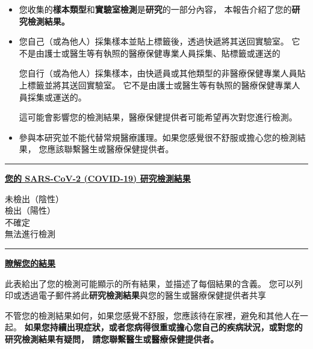 \documentclass[10pt]{article}
\newcommand{\PageLine}{\rule{\textwidth}{0.25mm}}
\begin{document}
\begin{itemize}
\item

  您收集的\textbf{樣本類型}和\textbf{實驗室檢測}是\textbf{研究}的一部分內容，
  本報告介紹了您的\textbf{研究檢測結果。}

\item
  您自己（或為他人）採集樣本並貼上標籤後，透過快遞將其送回實驗室。
  它不是由護士或醫生等有執照的醫療保健專業人員採集、貼標籤或運送的

  您自行（或為他人）採集樣本，由快遞員或其他類型的非醫療保健專業人員貼上標籤並將其送回實驗室。
  它不是由護士或醫生等有執照的醫療保健專業人員採集或運送的。



  這可能會影響您的檢測結果，醫療保健提供者可能希望再次對您進行檢測。

\item

  參與本研究並不能代替常規醫療護理。如果您感覺很不舒服或擔心您的檢測結果，
  您應該聯繫醫生或醫療保健提供者。

\end{itemize}

\bigskip
\PageLine

\large \underline{\textbf{您的 SARS-CoV-2 (COVID-19) 研究檢測結果}}

未檢出（陰性）\\
檢出（陽性）\\
不確定\\
無法進行檢測\\

\PageLine
\bigskip

\large \underline{\textbf{瞭解您的結果}}

此表給出了您的檢測可能顯示的所有結果，並描述了每個結果的含義。
您可以列印或透過電子郵件將此\textbf{研究檢測結果}與您的醫生或醫療保健提供者共享

不管您的檢測結果如何，如果您感覺不舒服，您應該待在家裡，避免和其他人在一起。
\textbf{如果您持續出現症狀，或者您病得很重或擔心您自己的疾病狀況，或對您的研究檢測結果有疑問，
請您聯繫醫生或醫療保健提供者。}
\end{document}
